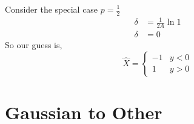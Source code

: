 \documentclass[journal, 12pt, twocolumn]{IEEEtran}
\begin{document}
\begin{enumerate}[label=\arabic{section}.\arabic*]
        Consider the special case $p=\frac{1}{2}$
        \begin{align}
            \delta &= \frac{1}{2 A} \ln 1 \\
            \delta &= 0
        \end{align}
        So our guess is,
        \begin{equation}
            \hat{X} = \begin{cases}
                -1 & y < 0 \\
                1 & y > 0
            \end{cases}
        \end{equation}

\end{enumerate}

\section{Gaussian to Other}
\end{document}

